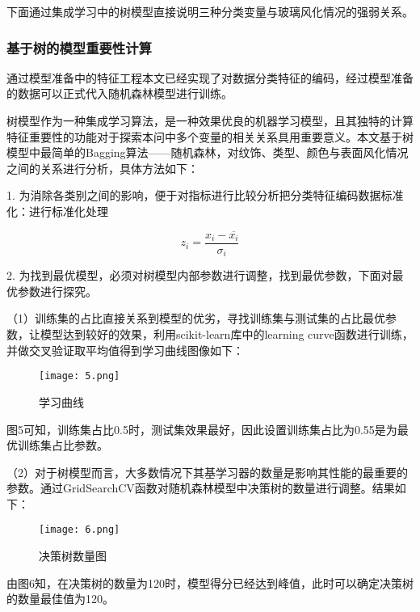 下面通过集成学习中的树模型直接说明三种分类变量与玻璃风化情况的强弱关系。

\subsubsection{基于树的模型重要性计算}

通过模型准备中的特征工程本文已经实现了对数据分类特征的编码，经过模型准备的数据可以正式代入随机森林模型进行训练。

树模型作为一种集成学习算法，是一种效果优良的机器学习模型，且其独特的计算特征重要性的功能对于探索本问中多个变量的相关关系具用重要意义。本文基于树模型中最简单的Bagging算法——随机森林，对纹饰、类型、颜色与表面风化情况之间的关系进行分析，具体方法如下：

1. 为消除各类别之间的影响，便于对指标进行比较分析把分类特征编码数据标准化：进行标准化处理

\begin{equation}
  {{z}_{i}}=\frac{{{x}_{i}}-\overline{{{x}_{i}}}}{{{\sigma }_{i}}}
\end{equation}


2. 为找到最优模型，必须对树模型内部参数进行调整，找到最优参数，下面对最优参数进行探究。

（1）训练集的占比直接关系到模型的优劣，寻找训练集与测试集的占比最优参数，让模型达到较好的效果，利用scikit-learn库中的learning curve函数进行训练，并做交叉验证取平均值得到学习曲线图像如下：

\begin{figure}[H] 
	\centering %
	\texttt{[image: 5.png]} %
	\caption{学习曲线} %
	\label{Fig.main6} %
\end{figure}


图5可知，训练集占比0.5时，测试集效果最好，因此设置训练集占比为0.55是为最优训练集占比参数。

（2）对于树模型而言，大多数情况下其基学习器的数量是影响其性能的最重要的参数。通过GridSearchCV函数对随机森林模型中决策树的数量进行调整。结果如下：

\begin{figure}[H] 
	\centering %
	\texttt{[image: 6.png]} %
	\caption{决策树数量图} %
	\label{Fig.main7} %
\end{figure}

由图6知，在决策树的数量为120时，模型得分已经达到峰值，此时可以确定决策树的数量最佳值为120。

